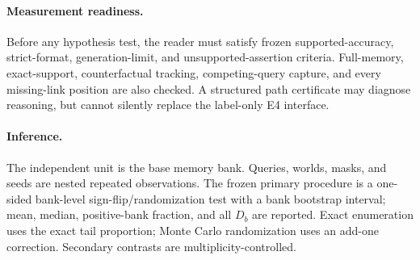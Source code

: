 \paragraph{Measurement readiness.}
Before any hypothesis test, the reader must satisfy frozen supported-accuracy,
strict-format, generation-limit, and unsupported-assertion criteria. Full-memory,
exact-support, counterfactual tracking, competing-query capture, and every
missing-link position are also checked. A structured path certificate may diagnose
reasoning, but cannot silently replace the label-only E4 interface.

\paragraph{Inference.}
The independent unit is the base memory bank. Queries, worlds, masks, and seeds are
nested repeated observations. The frozen primary procedure is a one-sided
bank-level sign-flip/randomization test with a bank bootstrap interval; mean,
median, positive-bank fraction, and all \(D_b\) are reported. Exact enumeration uses
the exact tail proportion; Monte Carlo randomization uses an add-one correction.
Secondary contrasts are multiplicity-controlled.
